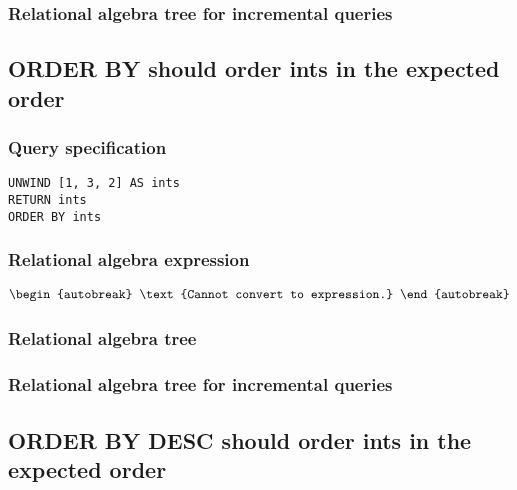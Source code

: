 \subsubsection*{Relational algebra tree for incremental queries}


\subsection{ORDER BY should order ints in the expected order}

\subsubsection*{Query specification}

\begin{lstlisting}
UNWIND [1, 3, 2] AS ints
RETURN ints
ORDER BY ints
\end{lstlisting}

\subsubsection*{Relational algebra expression}

\begin{align*}
\begin{autobreak}
\text{Cannot convert to expression.}
\end{autobreak}
\end{align*}

\subsubsection*{Relational algebra tree}


\subsubsection*{Relational algebra tree for incremental queries}


\subsection{ORDER BY DESC should order ints in the expected order}

